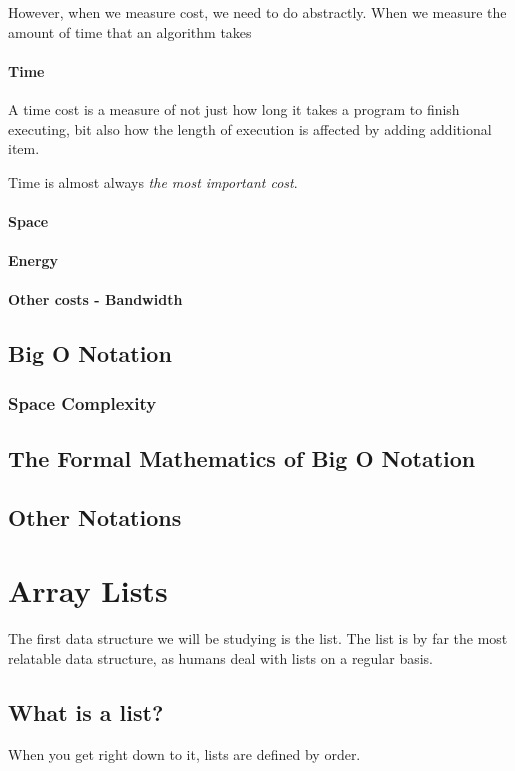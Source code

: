 \documentclass[10pt,a4paper]{book}
\begin{document}
However, when we measure cost, we need to do abstractly.  
When we measure the amount of time that an algorithm takes

\subsubsection{Time}
A time cost is a measure of not just how long it takes a program to finish executing, bit also how the length of execution is affected by adding additional item.

Time is almost always \emph{the most important cost}.

\subsubsection{Space}
\subsubsection{Energy}
\subsubsection{Other costs - Bandwidth}

\section{Big O Notation}
\subsection{Space Complexity}

\section{The Formal Mathematics of Big O Notation}
\section{Other Notations}

\chapter{Array Lists}
The first data structure we will be studying is the list.
The list is by far the most relatable data structure, as humans deal with lists on a regular basis.

\section{What is a list?}
When you get right down to it, lists are defined by order.
\end{document}
